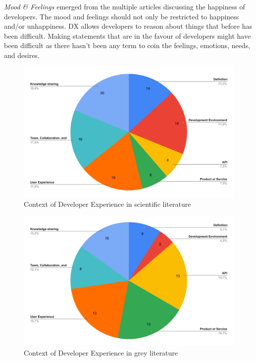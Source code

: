 \documentclass[english, 12pt, a4paper, sci, utf8, a-1b, online]{aaltothesis}
\begin{document}
\textit{Mood \& Feelings} emerged from the multiple articles discussing the happiness of developers. The mood and feelings should not only be restricted to happiness and/or unhappiness. DX allows developers to reason about things that before has been difficult. Making statements that are in the favour of developers might have been difficult as there hasn't been any term to coin the feelings, emotions, needs, and desires.

\begin{figure}[ht]
  \caption{Context of Developer Experience in scientific literature}
  \begin{center}
    \includegraphics[width=\textwidth]{context-scientific.pdf}
  \end{center}
\end{figure}

\begin{figure}[ht]
  \caption{Context of Developer Experience in grey literature}
  \begin{center}
    \includegraphics[width=\textwidth]{context-grey.pdf}
  \end{center}
\end{figure}
\end{document}
